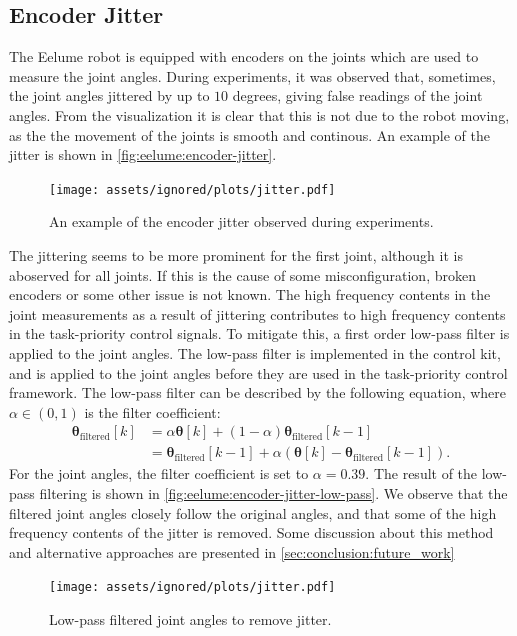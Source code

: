 \subsection*{Encoder Jitter}
The Eelume robot is equipped with encoders on the joints which are used to measure the joint angles.
During experiments, it was observed that, sometimes, the joint angles jittered by up to \(10\) degrees,
giving false readings of the joint angles. From the visualization it is clear that this is not due to the robot moving,
as the the movement of the joints is smooth and continous. An example of the jitter is shown in \autoref{fig:eelume:encoder-jitter}.
\begin{figure}[h!]
    \centering
    \texttt{[image: assets/ignored/plots/jitter.pdf]}
    \caption{An example of the encoder jitter observed during experiments.}
    \label{fig:eelume:encoder-jitter}
\end{figure}
The jittering seems to be more prominent for the first joint, although it is aboserved for all joints.
If this is the cause of some misconfiguration, broken encoders or some other issue is not known.
The high frequency contents in the joint measurements as a result of jittering
contributes to high frequency contents in the task-priority control signals. To
mitigate this, a first order low-pass filter is applied to the joint angles. The
low-pass filter is implemented in the control kit, and is applied to the joint angles before
they are used in the task-priority control framework. The low-pass filter can be
described by the following equation, where \(\alpha \in (0, 1)\) is the filter coefficient:
\begin{subequations}
\begin{align}
    \bm{\theta}_{\textrm{filtered}}[k] &= \alpha \bm{\theta}[k] + (1 - \alpha)\bm{\theta}_{\text{filtered}}[k-1] \\
    &= \bm{\theta}_{\textrm{filtered}}[k-1] + \alpha\left( \bm{\theta}[k] - \bm{\theta}_{\textrm{filtered}}[k-1] \right).
\end{align}
\end{subequations}
For the joint angles, the filter coefficient is set to \(\alpha = 0.39\). The
result of the low-pass filtering is shown in \autoref{fig:eelume:encoder-jitter-low-pass}.
We observe that the filtered joint angles closely follow the original angles,
and that some of the high frequency contents of the jitter is removed. Some discussion
about this method and alternative approaches are presented in \autoref{sec:conclusion:future_work}
\begin{figure}[h!]
    \centering
    \texttt{[image: assets/ignored/plots/jitter.pdf]}
    \caption{Low-pass filtered joint angles to remove jitter.}
    \label{fig:eelume:encoder-jitter-low-pass}
\end{figure}

